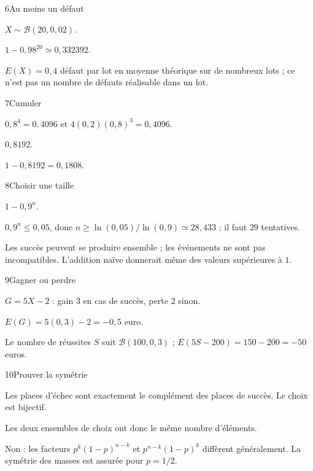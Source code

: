 \begin{corrige}{6}{Au moins un défaut}
\begin{questions}
\item $X\sim\mathcal B(20,0{,}02)$.
\item $1-0{,}98^{20}\simeq0{,}332392$.
\item $E(X)=0{,}4$ défaut par lot en moyenne théorique sur de nombreux lots ; ce n’est pas un nombre de défauts réalisable dans un lot.
\end{questions}
\end{corrige}
\begin{corrige}{7}{Cumuler}
\begin{questions}
\item $0{,}8^4=0{,}4096$ et $4(0{,}2)(0{,}8)^3=0{,}4096$.
\item $0{,}8192$.
\item $1-0{,}8192=0{,}1808$.
\end{questions}
\end{corrige}
\begin{corrige}{8}{Choisir une taille}
\begin{questions}
\item $1-0{,}9^n$.
\item $0{,}9^n\leq0{,}05$, donc $n\geq\ln(0{,}05)/\ln(0{,}9)\simeq28{,}433$ ; il faut $29$ tentatives.
\item Les succès peuvent se produire ensemble ; les événements ne sont pas incompatibles. L’addition naïve donnerait même des valeurs supérieures à $1$.
\end{questions}
\end{corrige}
\begin{corrige}{9}{Gagner ou perdre}
\begin{questions}
\item $G=5X-2$ : gain $3$ en cas de succès, perte $2$ sinon.
\item $E(G)=5(0{,}3)-2=-0{,}5$ euro.
\item Le nombre de réussites $S$ suit $\mathcal B(100,0{,}3)$ ; $E(5S-200)=150-200=-50$ euros.
\end{questions}
\end{corrige}
\begin{corrige}{10}{Prouver la symétrie}
\begin{questions}
\item Les places d’échec sont exactement le complément des places de succès. Le choix est bijectif.
\item Les deux ensembles de choix ont donc le même nombre d’éléments.
\item Non : les facteurs $p^k(1-p)^{n-k}$ et $p^{n-k}(1-p)^k$ diffèrent généralement. La symétrie des masses est assurée pour $p=1/2$.
\end{questions}
\end{corrige}
